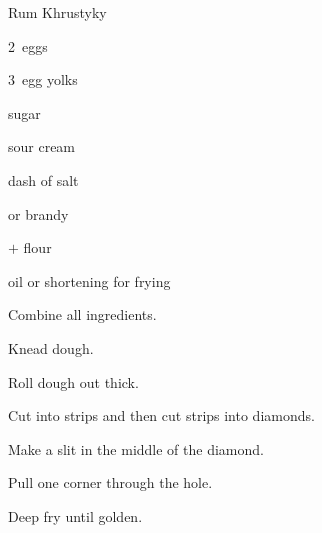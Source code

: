 \begin{recipe}{Rum Khrustyky}{}{}

\begin{ingredients}
\item 2~eggs
\item 3~egg yolks
\item {} sugar
\item {} sour cream
\item dash of salt
\item {}  or brandy
\item {}$+$ flour
\item oil or shortening for frying
\end{ingredients}

\begin{directions}
\item Combine all ingredients.
\item Knead dough.
\item Roll dough out \inch{\eighth} thick.
\item Cut into strips and then cut strips into diamonds.
\item Make a slit in the middle of the diamond.
\item Pull one corner through the hole.
\item Deep fry until golden.
\end{directions}

\end{recipe}
